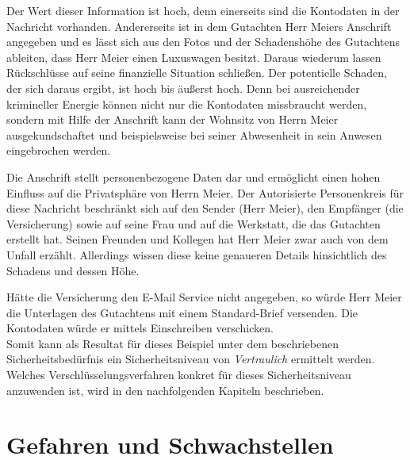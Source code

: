 \documentclass  [paper=a4,
				fontsize=12pt,
				listof=totoc,
				bibliography=totoc
				]{scrreprt}
\begin{document}
		Der Wert dieser Information ist hoch, denn einerseits sind die Kontodaten in der Nachricht vorhanden. Andererseits ist in dem Gutachten Herr Meiers Anschrift angegeben und es lässt sich aus den Fotos und der Schadenshöhe des Gutachtens ableiten, dass Herr Meier einen Luxuswagen besitzt. Daraus wiederum lassen Rückschlüsse auf seine finanzielle Situation schließen. Der potentielle Schaden, der sich daraus ergibt, ist hoch bis äußerst hoch. Denn bei ausreichender krimineller Energie können nicht nur die Kontodaten missbraucht werden, sondern mit Hilfe der Anschrift kann der Wohnsitz von Herrn Meier ausgekundschaftet und beispielsweise bei seiner Abwesenheit in sein Anwesen eingebrochen werden. 
		
		Die Anschrift stellt personenbezogene Daten dar und ermöglicht einen hohen Einfluss auf die Privatsphäre von Herrn Meier.
		Der Autorisierte Personenkreis für diese Nachricht beschränkt sich auf den Sender (Herr Meier), den Empfänger (die Versicherung) sowie auf seine Frau und auf die Werkstatt, die das Gutachten erstellt hat. Seinen Freunden und Kollegen hat Herr Meier zwar auch von dem Unfall erzählt. Allerdings wissen diese keine genaueren Details hinsichtlich des Schadens und dessen Höhe.
		
		Hätte die Versicherung den E-Mail Service nicht angegeben, so würde Herr Meier die Unterlagen des Gutachtens mit einem Standard-Brief versenden. Die Kontodaten würde er mittels Einschreiben verschicken.
		\medskip\\
		
		Somit kann als Resultat für dieses Beispiel unter dem beschriebenen Sicherheitsbedürfnis ein Sicherheitsniveau von \textit{Vertraulich} ermittelt werden. Welches Verschlüsselungsverfahren konkret für dieses Sicherheitsniveau anzuwenden ist, wird in den nachfolgenden Kapiteln beschrieben.
		
	\chapter{Gefahren und Schwachstellen}
		\label{chap:gefahren}
\color{darkred}
\end{document}
